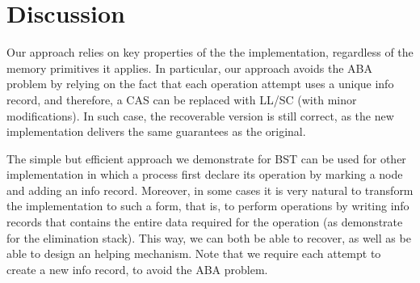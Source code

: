 \section{Discussion}

Our approach relies on key properties of the the implementation,
regardless of the memory primitives it applies.
In particular, our approach avoids the ABA problem by relying on the
fact that each operation attempt uses a unique info record,
and therefore, a CAS can be replaced with LL/SC (with minor modifications).
In such case, the recoverable version is still correct,
as the new implementation delivers the same guarantees as the original.

The simple but efficient approach we demonstrate for BST can be used
for other implementation in which a process first declare its operation
by marking a node and adding an info record.
Moreover, in some cases it is very natural to transform the implementation
to such a form, that is, to perform operations by writing info records
that contains the entire data required for the operation
(as demonstrate for the elimination stack).
This way, we can both be able to recover,
as well as be able to design an helping mechanism.
Note that we require each attempt to create a new info record,
to avoid the ABA problem.
